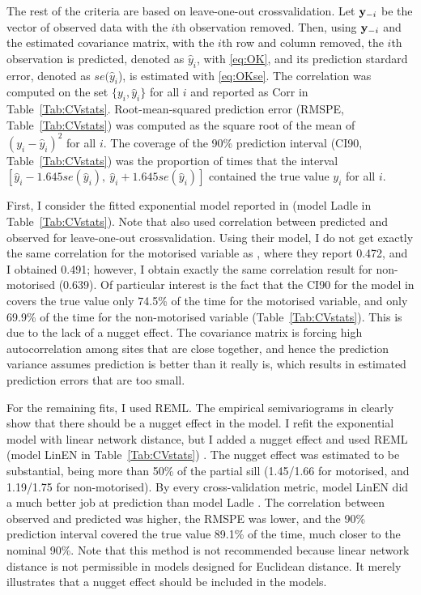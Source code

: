 \documentclass[11pt, titlepage]{article}\usepackage[]{graphicx}\usepackage[]{color}
\begin{document}
\begin{spacing}{1.9}
\begin{flushleft}
The rest of the criteria are based on leave-one-out crossvalidation.  Let $\mathbf{y}_{-i}$ be the vector of observed data with the $i$th observation removed. Then, using $\mathbf{y}_{-i}$ and the estimated covariance matrix, with the $i$th row and column removed, the $i$th observation is predicted, denoted as $\hat{y}_i$,  with \ref{eq:OK}, and its prediction stardard error, denoted as $se(\hat{y}_i$), is estimated with \ref{eq:OKse}. The correlation was computed on the set $\{y_i,\hat{y}_i\}$ for all $i$ and reported as Corr in Table~\ref{Tab:CVstats}.  Root-mean-squared prediction error (RMSPE, Table~\ref{Tab:CVstats}) was computed as the square root of the mean of $(y_i-\hat{y}_i)^2$ for all $i$. The coverage of the 90\% prediction interval (CI90, Table~\ref{Tab:CVstats}) was the proportion of times that the interval $[\hat{y}_i - 1.645 se(\hat{y}_i), \ \hat{y}_i + 1.645 se(\hat{y}_i)]$ contained the true value $y_i$ for all $i$.

First, I consider the fitted exponential model reported in \citet{Ladl:Avga:Whea:Boyc:pred:2016} (model Ladle in Table~\ref{Tab:CVstats}). Note that \citet{Ladl:Avga:Whea:Boyc:pred:2016} also used correlation between predicted and observed for leave-one-out crossvalidation. Using their model, I do not get exactly the same correlation for the motorised variable as \citet{Ladl:Avga:Whea:Boyc:pred:2016}, where they report 0.472, and I obtained 0.491; however, I obtain exactly the same correlation result for non-motorised (0.639).  Of particular interest is the fact that the CI90 for the model in \citet{Ladl:Avga:Whea:Boyc:pred:2016} covers the true value only 74.5\% of the time for the motorised variable, and only 69.9\% of the time for the non-motorised variable (Table~\ref{Tab:CVstats}). This is due to the lack of a nugget effect. The covariance matrix is forcing high autocorrelation among sites that are close together, and hence the prediction variance assumes prediction is better than it really is, which results in estimated prediction errors that are too small. 

 For the remaining fits, I used REML. The empirical semivariograms in \citet{Ladl:Avga:Whea:Boyc:pred:2016} clearly show that there should be a nugget effect in the model. I refit the exponential model with linear network distance, but I added a nugget effect and used REML (model LinEN in Table~\ref{Tab:CVstats}) .  The nugget effect was estimated to be substantial, being more than 50\% of the partial sill (1.45/1.66 for motorised, and 1.19/1.75 for non-motorised). By every cross-validation metric, model LinEN did a much better job at prediction than model Ladle  \citep{Ladl:Avga:Whea:Boyc:pred:2016}.  The correlation between observed and predicted was higher, the RMSPE was lower, and the 90\% prediction interval covered the true value 89.1\% of the time, much closer to the nominal 90\%. Note that this method is not recommended because linear network distance is not permissible in models designed for Euclidean distance. It merely illustrates that a nugget effect should be included in the models.


\end{flushleft}
\end{spacing}
\end{document}
